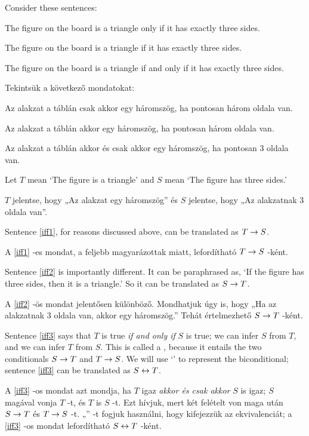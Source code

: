 Consider these sentences:
\begin{earg}
\item[\ex{iff1}] The figure on the board is a triangle only if it has exactly three sides.
\item[\ex{iff2}] The figure on the board is a triangle if it has exactly three sides.
\item[\ex{iff3}] The figure on the board is a triangle if and only if it has exactly three sides.
\end{earg}

Tekintsük a következő mondatokat:
\begin{earg}
\item[\ex{iff1}] Az alakzat a táblán csak akkor egy háromszög, ha pontosan három oldala van.
\item[\ex{iff2}] Az alakzat a táblán akkor egy háromszög, ha pontosan három oldala van.
\item[\ex{iff3}] Az alakzat a táblán akkor és csak akkor egy háromszög, ha pontosan 3 oldala van.
\end{earg}

Let $T$ mean `The figure is a triangle' and $S$ mean `The figure has three sides.'

$T$ jelentse, hogy „Az alakzat egy háromszög” és $S$ jelentse, hogy „Az alakzatnak 3 oldala van”.

Sentence \ref{iff1}, for reasons discussed above, can be translated as $T\rightarrow S$.

A \ref{iff1} -es mondat, a feljebb magyarázottak miatt, lefordítható $T\rightarrow S$ -ként.

Sentence \ref{iff2} is importantly different. It can be paraphrased as, `If the figure has three sides, then it is a triangle.' So it can be translated as $S\rightarrow T$.

A \ref{iff2} -ös mondat jelentősen különböző. Mondhatjuk úgy is, hogy „Ha az alakzatnak 3 oldala van, akkor egy háromszög.” Tehát értelmezhető $S\rightarrow T$ -ként.

Sentence \ref{iff3} says that $T$ is true \emph{if and only if} $S$ is true; we can infer $S$ from $T$, and we can infer $T$ from $S$. This is called a , because it entails the two conditionals $S\rightarrow T$ and $T \rightarrow S$. We will use `\eiff' to represent the biconditional; sentence \ref{iff3} can be translated as $S \leftrightarrow T$.

A \ref{iff3} -os mondat azt mondja, ha $T$ igaz \emph{akkor és csak akkor} $S$ is igaz; $S$ magával vonja $T$ -t, és $T$ is $S$ -t. Ezt  hívjuk, mert két felételt von maga után $S\rightarrow T$ és $T \rightarrow S$ -t. „\eiff” -t fogjuk használni, hogy kifejezzük az ekvivalenciát; a \ref{iff3} -os mondat lefordítható $S \leftrightarrow T$ -ként.

